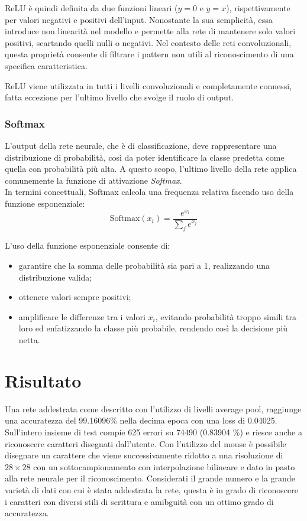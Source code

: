 \documentclass[a4paper,12pt]{article}
\begin{document}
ReLU è quindi definita da due funzioni lineari ($y=0$ e $y=x$), rispettivamente per valori negativi e positivi dell'input. Nonostante la sua semplicità, essa introduce non linearità nel modello e permette alla rete di mantenere solo valori positivi, scartando quelli nulli o negativi.  
Nel contesto delle reti convoluzionali, questa proprietà consente di filtrare i pattern non utili al riconoscimento di una specifica caratteristica.  

ReLU viene utilizzata in tutti i livelli convoluzionali e completamente connessi, fatta eccezione per l'ultimo livello che svolge il ruolo di output.

\subsubsection{Softmax}
L'output della rete neurale, che è di classificazione, deve rappresentare una distribuzione di probabilità, così da poter identificare la classe predetta come quella con probabilità più alta. A questo scopo, l'ultimo livello della rete applica comunemente la funzione di attivazione \textit{Softmax}.\\
In termini concettuali, Softmax calcola una frequenza relativa facendo uso della funzione esponenziale:
$$
    \text{Softmax}(x_i) = \frac{\displaystyle e^{\displaystyle x_i}}{\displaystyle \sum_j e^{\displaystyle x_j}}
$$

L'uso della funzione esponenziale consente di:
\begin{itemize}
    \item garantire che la somma delle probabilità sia pari a 1, realizzando una distribuzione valida;
    \item ottenere valori sempre positivi;
    \item amplificare le differenze tra i valori $x_i$, evitando probabilità troppo simili tra loro ed enfatizzando la classe più probabile, rendendo così la decisione più netta.
\end{itemize}

\section{Risultato}
Una rete addestrata come descritto con l'utilizzo di livelli average pool, raggiunge una accuratezza del 99.16096\% nella decima epoca con una loss di 0.04025.
Sull'intero insieme di test compie 625 errori su 74490 (0.83904 \%) e riesce anche a riconoscere caratteri disegnati dall'utente. Con l'utilizzo del mouse è possibile disegnare un carattere che viene successivamente ridotto a una risoluzione di $28 \times 28$ con un sottocampionamento con interpolazione bilineare e dato in pasto alla rete neurale  per il riconoscimento.
Considerati il grande numero e la grande varietà di dati con cui è stata addestrata la rete, questa è in grado di riconoscere i caratteri con diversi stili di scrittura e amibguità con un ottimo grado di accuratezza.
\end{document}
